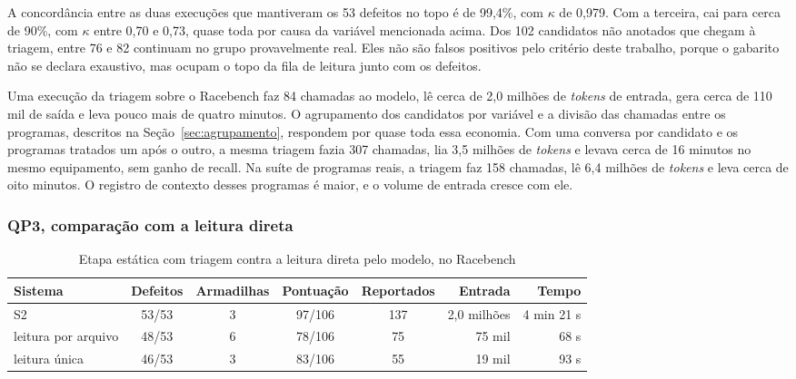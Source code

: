 A concordância entre as duas execuções que mantiveram os 53 defeitos no topo é
de 99,4\%, com $\kappa$ de 0,979. Com a terceira, cai para cerca de 90\%, com
$\kappa$ entre 0,70 e 0,73, quase toda por causa da variável mencionada acima.
Dos 102 candidatos não anotados que chegam à triagem, entre 76 e 82 continuam
no grupo provavelmente real. Eles não são falsos positivos pelo critério deste
trabalho, porque o gabarito não se declara exaustivo, mas ocupam o topo da
fila de leitura junto com os defeitos.

Uma execução da triagem sobre o Racebench faz 84 chamadas ao modelo, lê cerca
de 2,0 milhões de \textit{tokens} de entrada, gera cerca de 110 mil de saída e
leva pouco mais de quatro minutos. O agrupamento dos candidatos por variável e
a divisão das chamadas entre os programas, descritos na
Seção~\ref{sec:agrupamento}, respondem por quase toda essa economia. Com uma conversa
por candidato e os programas tratados um após o outro, a mesma triagem fazia
307 chamadas, lia 3,5 milhões de \textit{tokens} e levava cerca de 16 minutos
no mesmo equipamento, sem ganho de recall. Na suíte de programas reais, a
triagem faz 158 chamadas, lê 6,4 milhões de \textit{tokens} e leva cerca de
oito minutos. O registro de contexto desses programas é maior, e o volume de
entrada cresce com ele.

\subsubsection{QP3, comparação com a leitura direta}

\begin{table}[htb]
  \centering
  \caption{Etapa estática com triagem contra a leitura direta pelo modelo, no
  Racebench}
  \label{tab:qp3-racebench}
  \small
  \setlength{\tabcolsep}{4pt}
  \begin{tabular}{|l|c|c|c|c|r|r|}
    \hline
    Sistema & Defeitos & Armadilhas & Pontuação & Reportados & Entrada & Tempo \\
    \hline
    S2 & 53/53 & 3 & 97/106 & 137 & 2,0 milhões & 4 min 21 s \\
    leitura por arquivo & 48/53 & 6 & 78/106 & 75 & 75 mil & 68 s \\
    leitura única & 46/53 & 3 & 83/106 & 55 & 19 mil & 93 s \\
    \hline
  \end{tabular}
\end{table}

